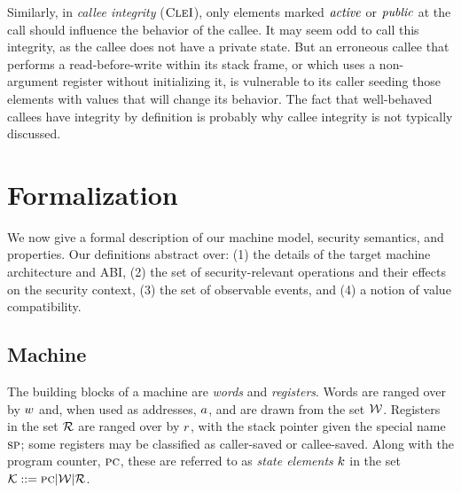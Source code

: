 \documentclass[10pt,conference]{ieeetran}%
\theoremstyle{definition}
\begin{document}
Similarly, in \emph{callee integrity} (\(\textnormal{\sc CleI}\)), only elements marked \(\mathit{active}\)
or \(\mathit{public}\) at the call should influence the behavior of the callee. It may seem
odd to call this integrity, as the callee does not have a private state. But
an erroneous callee that performs a read-before-write within its stack
frame, or which uses a non-argument register without initializing it, is vulnerable
to its caller seeding those elements with values that will change its behavior.
The fact that well-behaved callees have integrity by definition is probably why
callee integrity is not typically discussed.

\section{Formalization}
\label{sec:formal}

We now give a formal description of our machine model, security semantics,
and properties. Our definitions abstract over: (1) the details of  the target machine
architecture and ABI, (2) the set of security-relevant operations and their effects on
the security context, (3) the set of observable events, and (4) a notion of value compatibility.

\subsection{Machine}
The building blocks of a machine are {\em words} and {\em registers}.
Words are ranged over by \(w\) and, when used as addresses, \(a\),
and are drawn from the set \({\mathcal W}\).
Registers in the set \({\mathcal R}\) are ranged over by \(r\), with the stack pointer
given the special name \(\textsc{sp}\);
some registers may be classified as caller-saved or callee-saved.
Along with the program counter, \(\textsc{pc}\), these are referred to as
{\em state elements} \(k\) in the set \({\mathcal K} ::= \textsc{pc} | {\mathcal W} | {\mathcal R}\).
\end{document}
